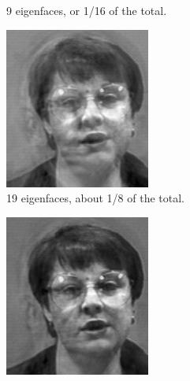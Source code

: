 \begin{figure}
\begin{subfigure}[b]{0.3\textwidth}
    \caption{9 eigenfaces, or 1/16 of the total.}
    \label{fig:9_efaces}
\end{subfigure}
\begin{subfigure}[b]{0.3\textwidth}
    \includegraphics[width=\textwidth]{figures/rebuiltEighth.png}
    \caption{19 eigenfaces, about 1/8 of the total.}
    \label{fig:19_efaces}
\end{subfigure}
\begin{subfigure}[b]{0.3\textwidth}
    \includegraphics[width=\textwidth]{figures/rebuiltFourth.png}

\end{subfigure}
\end{figure}
